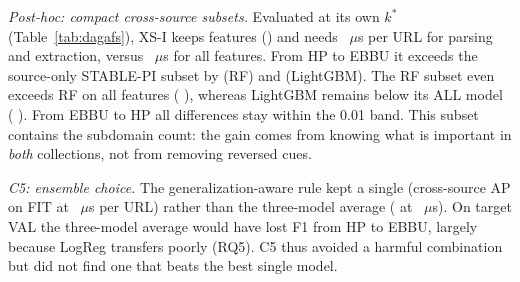 \begin{table}[t]
\caption{RQ6 paired domain-cluster bootstrap contrasts of target-VAL F1 ( replicates). $^\dagger$Post-hoc.}
\label{tab:dagafscon}
\centering\scriptsize
\resizebox{\columnwidth}{!}{}
\end{table}

\textit{Post-hoc: compact cross-source subsets.} Evaluated at its own $k^*$ (Table~\ref{tab:dagafs}), XS-I keeps  features () and needs ~$\mu$s per URL for parsing and extraction, versus ~$\mu$s for all features. From HP to EBBU it exceeds the source-only STABLE-PI subset by   (RF) and   (LightGBM). The RF subset even exceeds RF on all features ( ), whereas LightGBM remains below its ALL model ( ). From EBBU to HP all differences stay within the 0.01 band. This subset contains the subdomain count: the gain comes from knowing what is important in \emph{both} collections, not from removing reversed cues.

\textit{C5: ensemble choice.} The generalization-aware rule kept a single  (cross-source AP on FIT  at ~$\mu$s per URL) rather than the three-model average ( at ~$\mu$s). On target VAL the three-model average would have lost   F1 from HP to EBBU, largely because LogReg transfers poorly (RQ5). C5 thus avoided a harmful combination but did not find one that beats the best single model.
